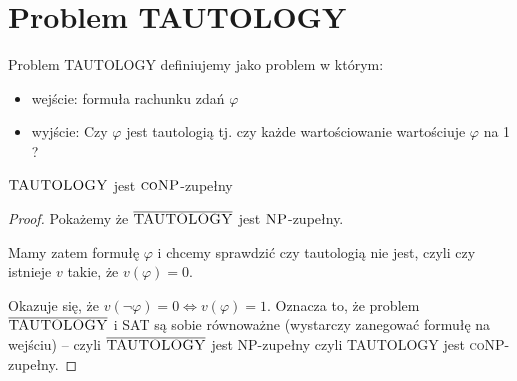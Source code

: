 \section{Problem TAUTOLOGY}

\begin{definition}
    Problem \textsc{TAUTOLOGY} definiujemy jako problem w którym:
    \begin{itemize}
        \item wejście: formuła rachunku zdań \( \varphi \)
        \item wyjście: Czy \( \varphi \) jest tautologią tj. czy każde wartościowanie wartościuje \( \varphi \) na 1 ?
    \end{itemize}
\end{definition}

\begin{theorem}
    \( \textsc{TAUTOLOGY} \) jest \( \textsc{coNP} \)-zupełny
\end{theorem}
\begin{proof}
    Pokażemy że \( \overline{\textsc{TAUTOLOGY}} \) jest \( \textsc{NP} \)-zupełny.
    
    Mamy zatem formułę \( \varphi \) i chcemy sprawdzić czy tautologią nie jest, czyli czy istnieje \( v \) takie, że \( v(\varphi) = 0 \). 
    
    Okazuje się, że \( v(\lnot \varphi) = 0 \iff v(\varphi) = 1 \). Oznacza to, że problem \( \overline{\textsc{TAUTOLOGY}} \) i \textsc{SAT} są sobie równoważne (wystarczy zanegować formułę na wejściu) -- czyli \( \overline{\textsc{TAUTOLOGY}} \) jest \textsc{NP}-zupełny czyli \textsc{TAUTOLOGY} jest \textsc{coNP}-zupełny.
    
\end{proof}